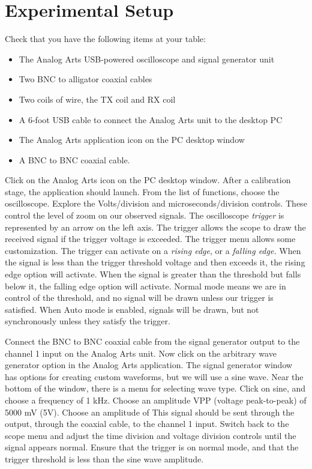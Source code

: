 \documentclass[12pt,twocolumn]{article}
\begin{document}
\section{Experimental Setup}

\noindent
Check that you have the following items at your table:
\begin{itemize}
\item The Analog Arts USB-powered oscilloscope and signal generator unit
\item Two BNC to alligator coaxial cables
\item Two coils of wire, the TX coil and RX coil
\item A 6-foot USB cable to connect the Analog Arts unit to the desktop PC
\item The Analog Arts application icon on the PC desktop window
\item A BNC to BNC coaxial cable.
\end{itemize}

Click on the Analog Arts icon on the PC desktop window.  After a calibration stage, the application should launch.  From the list of functions, choose the oscilloscope.  Explore the Volts/division and microseconds/division controls.  These control the level of zoom on our observed signals.  The oscilloscope \textit{trigger} is represented by an arrow on the left axis.  The trigger allows the scope to draw the received signal if the trigger voltage is exceeded.  The trigger menu allows some customization.  The trigger can activate on a \textit{rising edge}, or a \textit{falling edge.}  When the signal is less than the trigger threshold voltage and then exceeds it, the rising edge option will activate.  When the signal is greater than the threshold but falls below it, the falling edge option will activate.  Normal mode means we are in control of the threshold, and no signal will be drawn unless our trigger is satisfied.  When Auto mode is enabled, signals will be drawn, but not synchronously unless they satisfy the trigger.

Connect the BNC to BNC coaxial cable from the signal generator output to the channel 1 input on the Analog Arts unit.  Now click on the arbitrary wave generator option in the Analog Arts application.  The signal generator window has options for creating custom waveforms, but we will use a sine wave.  Near the bottom of the window, there is a menu for selecting wave type.  Click on sine, and choose a frequency of 1 kHz.  Choose an amplitude VPP (voltage peak-to-peak) of 5000 mV (5V).  Choose an amplitude of This signal should be sent through the output, through the coaxial cable, to the  channel 1 input.  Switch back to the scope menu and adjust the time division and voltage division controls until the signal appears normal.  Ensure that the trigger is on normal mode, and that the trigger threshold is less than the sine wave amplitude.
\end{document}
